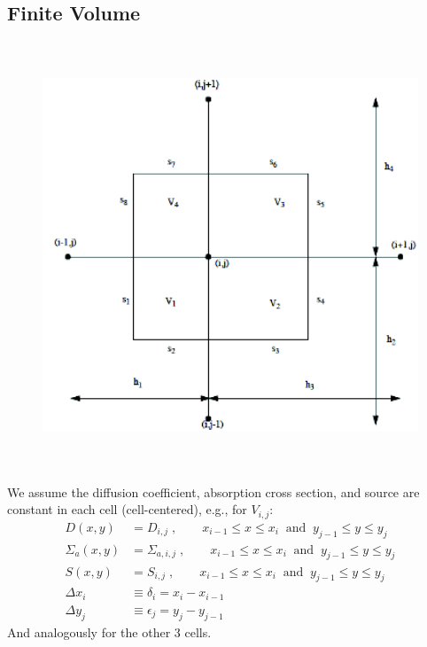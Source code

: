 \documentclass[12pt]{article}
\begin{document}
\subsection{Finite Volume}

\begin{figure}[h!]
\begin{center}
\includegraphics[height=5in]{2DfvmGrid}
\end{center}
\end{figure}

We assume the diffusion coefficient, absorption cross section, and source are constant in each cell (cell-centered), e.g., for $V_{i,j}$:
\begin{align}
D(x,y) &= D_{i,j}\;, \qquad x_{i-1} \leq x \leq x_i \:\text{ and }\: y_{j-1} \leq y \leq y_j \nonumber \\
%
\Sigma_a(x,y) &= \Sigma_{a,i,j}\;, \qquad x_{i-1} \leq x \leq x_i \:\text{ and }\: y_{j-1} \leq y \leq y_j \nonumber \\
%
S(x,y) &= S_{i,j}\;, \qquad x_{i-1} \leq x \leq x_i \:\text{ and }\: y_{j-1} \leq y \leq y_j \nonumber \\
%
\Delta x_i &\equiv \delta_i = x_{i} - x_{i-1} \nonumber \\
\Delta y_j &\equiv \epsilon_j = y_{j} - y_{j-1} \nonumber
\end{align}
And analogously for the other 3 cells.
\end{document}
